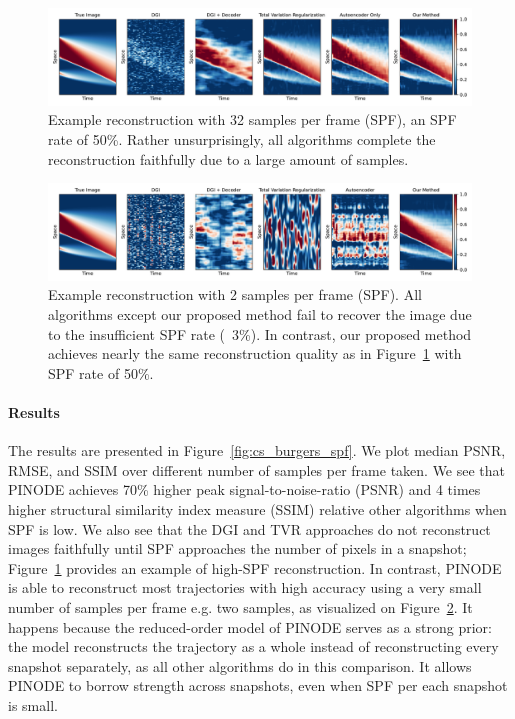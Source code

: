 \begin{figure}
    \centering
    	\includegraphics[width=\textwidth]{figures/cs_burgers_comparison_64.pdf}
    \caption{\label{fig:cs_burgers_example_large_spf} Example reconstruction with 32 samples per frame (SPF), an SPF rate of 50\%. Rather unsurprisingly, all algorithms complete the reconstruction faithfully due to a large amount of samples.}
\end{figure}

\begin{figure}
    \centering
    	\includegraphics[width=\textwidth]{figures/cs_burgers_comparison_4.pdf}
    \caption{\label{fig:cs_burgers_example_small_spf}Example reconstruction with 2 samples per frame (SPF). All algorithms except our proposed method fail to recover the image due to the insufficient SPF rate (~3\%). In contrast, our proposed method achieves nearly the same reconstruction quality as in Figure~\ref{fig:cs_burgers_example_large_spf} with SPF rate of 50\%.}
\end{figure}

\paragraph{Results} The results are presented in Figure~\ref{fig:cs_burgers_spf}. We plot median PSNR, RMSE, and SSIM over different number of samples per frame taken. We see that PINODE achieves 70\% higher peak signal-to-noise-ratio (PSNR) and 4 times higher structural similarity index measure (SSIM)  relative other algorithms when SPF is low. We also see that the DGI and TVR approaches do not reconstruct images faithfully until SPF approaches the number of pixels in a snapshot; Figure~\ref{fig:cs_burgers_example_large_spf} provides an example of high-SPF reconstruction. In contrast, PINODE is able to reconstruct most trajectories with high accuracy using a very small number of samples per frame e.g. two samples, as visualized on Figure~\ref{fig:cs_burgers_example_small_spf}. It happens because the reduced-order model of PINODE serves as a strong prior: the model reconstructs the trajectory as a whole instead of reconstructing every snapshot separately, as all other algorithms do in this comparison. It allows PINODE to borrow strength across snapshots, even when SPF per each snapshot is small.

